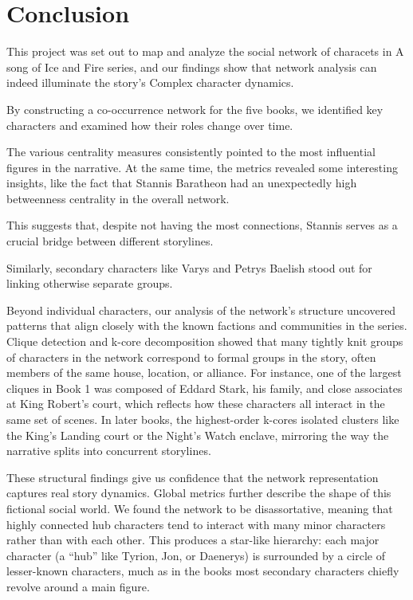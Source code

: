 \documentclass[12pt, a4paper]{article}
\begin{document}
  
\section{Conclusion}
\label{conclusion}

This project was set out to map and analyze the social network of characets in A song of Ice and Fire series, and our findings show that network analysis can indeed illuminate the story's Complex character dynamics.

By constructing a co-occurrence network for the five books, we identified key characters and examined how their roles change over time.

The various centrality measures consistently pointed to the most influential figures in the narrative.  At the same time, the metrics revealed some interesting insights, like the fact that Stannis Baratheon had an unexpectedly high betweenness centrality in the overall network.

This suggests that, despite not  having the most connections, Stannis serves as a crucial bridge between different storylines.

Similarly, secondary characters like Varys and Petrys Baelish stood out for linking otherwise separate groups.



Beyond individual characters, our analysis of the network’s structure uncovered patterns that align closely with the known factions and communities in the series. 
Clique detection and k-core decomposition showed that many tightly knit groups of characters in the network correspond to formal groups in the story,
 often members of the same house, location, or alliance. 
 For instance, one of the largest cliques in Book 1 was composed of Eddard Stark, his family, and close associates at King Robert’s court, 
 which reflects how these characters all interact in the same set of scenes. 
 In later books, the highest-order k-cores isolated clusters like the King’s Landing court or the Night’s Watch enclave, 
 mirroring the way the narrative splits into concurrent storylines. 

 These structural findings give us confidence that the network representation captures real story dynamics. 
 Global metrics further describe the shape of this fictional social world. 
 We found the network to be disassortative, meaning that highly connected hub characters tend to interact with many minor characters rather than with each other. 
 This produces a star-like hierarchy: each major character (a “hub” like Tyrion, Jon, or Daenerys) is surrounded by a circle of lesser-known characters, 
 much as in the books most secondary characters chiefly revolve around a main figure. 
\end{document}

